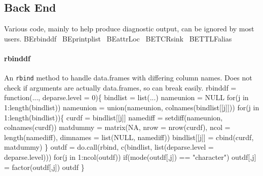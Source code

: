\documentclass[a4paper]{article}
\begin{document}
\subsection{Back End}
\label{sec:back.end}
Various code, mainly to help produce diagnostic output, can be ignored
by most users.
\nwenddocs{}\endmoddef
\LA{}BErbinddf~{\nwtagstyle{}}\RA{}
\LA{}BEprintplist~{\nwtagstyle{}}\RA{}
\LA{}BEattrLoc~{\nwtagstyle{}}\RA{}
\LA{}BETCRsink~{\nwtagstyle{}}\RA{}
\LA{}BETTLFalias~{\nwtagstyle{}}\RA{}
\nwendcode{}\nwdocspar

\paragraph{rbinddf}
An \verb|rbind| method to handle data.frames with differing column
names. Does not check if arguments are actually data.frames, so can
break easily.
\nwenddocs{}\endmoddef
rbinddf =
  function(..., deparse.level = 0)\{
    bindlist = list(...)
    nameunion = NULL
    for(j in 1:length(bindlist))
      nameunion = union(nameunion, colnames(bindlist[[j]]))
    for(j in 1:length(bindlist))\{
      curdf = bindlist[[j]]
      namediff = setdiff(nameunion, colnames(curdf))
      matdummy = matrix(NA, nrow = nrow(curdf), ncol = length(namediff),
        dimnames = list(NULL, namediff))
      bindlist[[j]] = cbind(curdf, matdummy)
    \}
    outdf = do.call(rbind,
      c(bindlist, list(deparse.level = deparse.level)))
    for(j in 1:ncol(outdf))
      if(mode(outdf[,j]) == "character") outdf[,j] = factor(outdf[,j])
    outdf
  \}
\eatline
{}\nwendcode{}\nwdocspar
\end{document}
